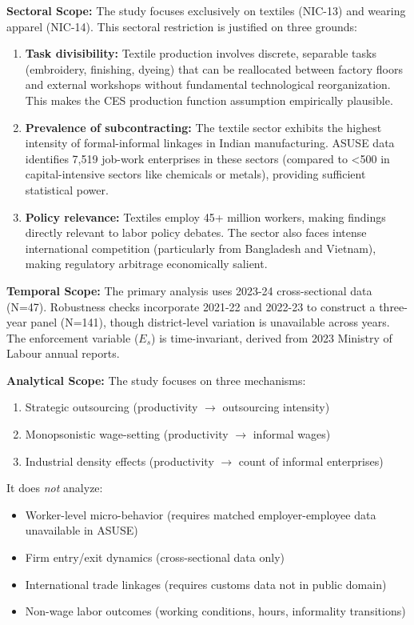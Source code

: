 \textbf{Sectoral Scope:} The study focuses exclusively on textiles (NIC-13) and wearing apparel (NIC-14). This sectoral restriction is justified on three grounds:

\begin{enumerate}
	\item \textbf{Task divisibility:} Textile production involves discrete, separable tasks (embroidery, finishing, dyeing) that can be reallocated between factory floors and external workshops without fundamental technological reorganization. This makes the CES production function assumption empirically plausible.
	
	\item \textbf{Prevalence of subcontracting:} The textile sector exhibits the highest intensity of formal-informal linkages in Indian manufacturing. ASUSE data identifies 7,519 job-work enterprises in these sectors (compared to <500 in capital-intensive sectors like chemicals or metals), providing sufficient statistical power.
	
	\item \textbf{Policy relevance:} Textiles employ 45+ million workers, making findings directly relevant to labor policy debates. The sector also faces intense international competition (particularly from Bangladesh and Vietnam), making regulatory arbitrage economically salient.
\end{enumerate}

\textbf{Temporal Scope:} The primary analysis uses 2023-24 cross-sectional data (N=47). Robustness checks incorporate 2021-22 and 2022-23 to construct a three-year panel (N=141), though district-level variation is unavailable across years. The enforcement variable ($E_s$) is time-invariant, derived from 2023 Ministry of Labour annual reports.

\textbf{Analytical Scope:} The study focuses on three mechanisms:
\begin{enumerate}
	\item Strategic outsourcing (productivity $\rightarrow$ outsourcing intensity)
	\item Monopsonistic wage-setting (productivity $\rightarrow$ informal wages)
	\item Industrial density effects (productivity $\rightarrow$ count of informal enterprises)
\end{enumerate}

It does \textit{not} analyze:
\begin{itemize}
	\item Worker-level micro-behavior (requires matched employer-employee data unavailable in ASUSE)
	\item Firm entry/exit dynamics (cross-sectional data only)
	\item International trade linkages (requires customs data not in public domain)
	\item Non-wage labor outcomes (working conditions, hours, informality transitions)
\end{itemize}

